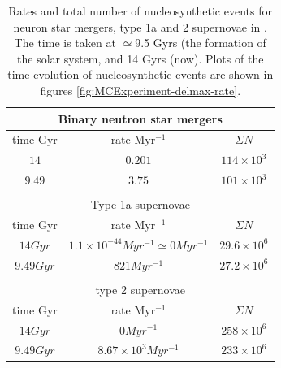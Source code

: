 \begin{table}[h]
  \centering
  \begin{tabular}{|c|c|c|}
    \multicolumn{3}{c}{Binary neutron star mergers} \\ \hline
    time $\mathrm{Gyr}$ & rate $\mathrm{Myr^{-1}}$ & $\Sigma N$ \\ \hline 
    $14$ & $0.201$ & $114 \times 10^3$ \\ \hline 
    $9.49$ & $3.75$ & $101 \times 10^3$ \\ \hline
    \multicolumn{3}{c}{} \\
    \multicolumn{3}{c}{Type 1a supernovae} \\ \hline
    time $\mathrm{Gyr}$ & rate $\mathrm{Myr^{-1}}$ & $\Sigma N$ \\ \hline 
    $14 Gyr$ & $1.1 \times 10^{-44} Myr^{-1} \simeq 0 Myr^{-1}$ & $29.6 \times 10^{6}$ \\ \hline 
    $9.49 Gyr$ & $821 Myr^{-1}$ & $27.2 \times 10^{6}$ \\ \hline
    \multicolumn{3}{c}{} \\
    \multicolumn{3}{c}{type 2 supernovae} \\ \hline
    time $\mathrm{Gyr}$ & rate $\mathrm{Myr^{-1}}$ & $\Sigma N$ \\ \hline 
    $14 Gyr$ & $0 Myr^{-1}$ & $258 \times 10^{6}$ \\ \hline 
    $9.49 Gyr$ & $8.67 \times 10^{3} Myr^{-1}$ & $233 \times 10^{6}$ \\ \hline
  \end{tabular}
  \caption[Rates and numbers of nucleosynthetic events in \expone]{\label{tab:nucleosynthetic-events}
    Rates and total number of nucleosynthetic events for neuron star mergers, type 1a and 2 supernovae in \omegamodel.
    The time is taken at $\simeq$9.5 Gyrs (the formation of the solar system, and 14 Gyrs (now).
    Plots of the time evolution of nucleosynthetic events are shown in figures \ref{fig:MCExperiment-delmax-rate}.
  }
\end{table}

